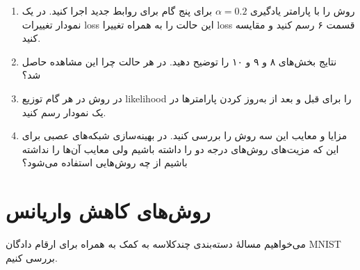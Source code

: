 \documentclass[11pt,a4paper]{article}
\begin{document}
\begin{enumerate}
\item
روش 
را با پارامتر یادگیری 
$\alpha = 0.2$
برای پنج گام برای روابط جدید اجرا کنید. در یک نمودار تغییرات loss این حالت را به همراه تغییرا loss قسمت ۶ رسم کنید و مقایسه کنید.
\item
نتایج بخش‌های ۸ و ۹ و ۱۰ را توضیح دهید. در هر حالت چرا این مشاهده حاصل شد؟
\item
در روش 
در هر گام توزیع likelihood را برای قبل و بعد از به‌روز کردن پارامترها در یک نمودار رسم کنید.
\item
مزایا و معایب این سه روش را بررسی کنید. در بهینه‌سازی شبکه‌های عصبی برای این که مزیت‌های روش‌های درجه دو را داشته باشیم ولی معایب آن‌ها را نداشته باشیم از چه روش‌هایی استفاده می‌شود؟
\end{enumerate}
\section*{روش‌های کاهش واریانس}
می‌خواهیم مسالهٔ دسته‌بندی چندکلاسه به کمک 
به همراه 
 برای ارقام دادگان MNIST بررسی کنیم.
 
\end{document}
